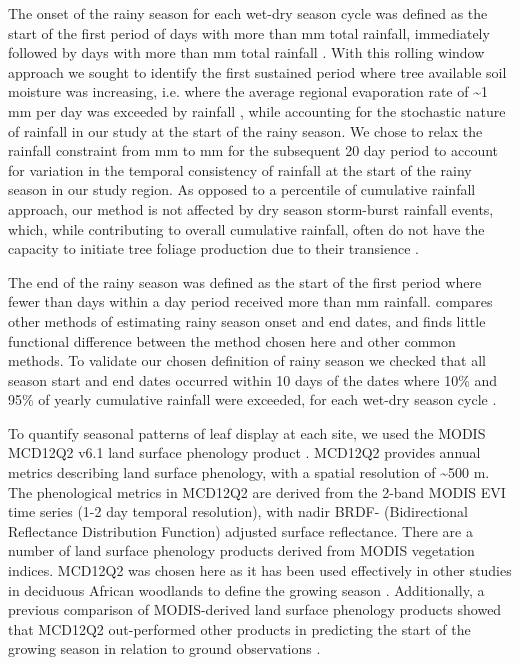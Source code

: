 \documentclass[11pt,a4paper]{article}
\begin{document}
The onset of the rainy season for each wet-dry season cycle was defined as the
start of the first period of \onsetPeriodOne{} days with more than
\onsetPrecipOne{} mm total rainfall, immediately followed by \onsetPeriodTwo{}
days with more than \onsetPrecipTwo{} mm total rainfall \citep{Tadross2005}. With this rolling
window approach we sought to identify the first sustained period where tree
available soil moisture was increasing, i.e. where the average regional
evaporation rate of \textasciitilde{}1 mm per day was exceeded by rainfall
\citep{Campbell1996}, while accounting for the stochastic nature of rainfall in
our study at the start of the rainy season. We chose to relax the rainfall
constraint from \onsetPrecipOne{} mm to \onsetPrecipTwo{} mm for the subsequent
20 day period to account for variation in the temporal consistency of rainfall
at the start of the rainy season in our study region. As opposed to a
percentile of cumulative rainfall approach, our method is not affected by dry
season storm-burst rainfall events, which, while contributing to overall
cumulative rainfall, often do not have the capacity to initiate tree foliage
production due to their transience \citep{February2016}. 

The end of the rainy season was defined as the start of the first period where
fewer than \numberstringnum{\rainyDaysEnd} days within a \periodEnd{} day
period received more than \rainyDef{} mm rainfall. \citet{Guan2014} compares
other methods of estimating rainy season onset and end dates, and finds little
functional difference between the method chosen here and other common methods.
To validate our chosen definition of rainy season we checked that all season
start and end dates occurred within 10 days of the dates where 10\% and 95\% of
yearly cumulative rainfall were exceeded, for each wet-dry season cycle
\citep{Adole2018a}. 

To quantify seasonal patterns of leaf display at each site, we used the MODIS
MCD12Q2 v6.1 land surface phenology product \citep{MCD12Q2}. MCD12Q2 provides
annual metrics describing land surface phenology, with a spatial resolution of
\textasciitilde{}500 m. The phenological metrics in MCD12Q2 are derived from
the 2-band MODIS EVI time series (1-2 day temporal resolution), with nadir BRDF- (Bidirectional Reflectance
Distribution Function) adjusted surface reflectance. There are a number of land
surface phenology products derived from MODIS vegetation indices. MCD12Q2 was
chosen here as it has been used effectively in other studies in deciduous
African woodlands to define the growing season \citep{Begue2014, Adole2018b}.
Additionally, a previous comparison of MODIS-derived land surface phenology
products showed that MCD12Q2 out-performed other products in predicting the
start of the growing season in relation to ground observations
\citep{Peng2017}. 
\end{document}
